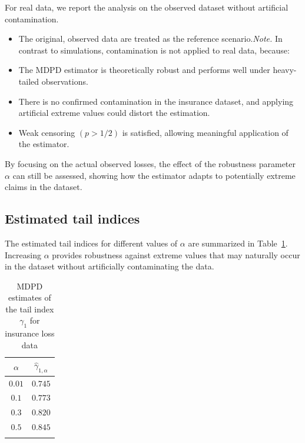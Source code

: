 \documentclass[reqno,openbib,runningheads,a4paper,12pt]{amsart}%
\begin{document}
\noindent For real data, we report the analysis on the observed dataset
without artificial contamination.

\begin{itemize}
\item The original, observed data are treated as the reference
scenario.\newline\textit{Note.} In contrast to simulations, contamination is
not applied to real data, because:

\item The MDPD estimator is theoretically robust and performs well under
heavy-tailed observations.

\item There is no confirmed contamination in the insurance dataset, and
applying artificial extreme values could distort the estimation.

\item Weak censoring $(p>1/2)$ is satisfied, allowing meaningful application
of the estimator.
\end{itemize}

\noindent By focusing on the actual observed losses, the effect of the
robustness parameter $\alpha$ can still be assessed, showing how the estimator
adapts to potentially extreme claims in the dataset.

\subsection{Estimated tail indices}

\noindent The estimated tail indices for different values of $\alpha$ are
summarized in Table~\ref{Tab1}. Increasing $\alpha$ provides robustness
against extreme values that may naturally occur in the dataset without
artificially contaminating the data.

\begin{center}%
\begin{table}[tbp] \centering
\begin{tabular}
[c]{c|c}%
$\alpha$ & $\widehat{\gamma}_{1,\alpha}$\\\hline
$0.01$ & $0.745$\\\hline
$0.1$ & $0.773$\\\hline
$0.3$ & $0.820$\\\hline
$0.5$ & $0.845$\\\hline
\multicolumn{2}{c}{}%
\end{tabular}
\caption{MDPD estimates of the tail index $\gamma_1$ for insurance loss data}\label{Tab1}%
\end{table}%



\end{center}
\end{document}
